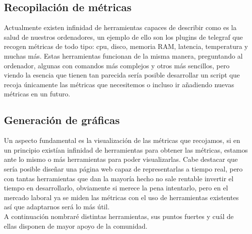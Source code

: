 \documentclass[ spanish, a4paper, 12pt, oneside]{report}
\begin{document}
\subsection{Recopilación de métricas}
Actualmente existen infinidad de herramientas capaces de describir como es la salud de nuestros ordenadores, un ejemplo de ello son los plugins de telegraf que recogen métricas de todo tipo: cpu, disco, 
memoria RAM, latencia, temperatura y muchas más. Estas herramientas funcionan de la misma manera, preguntando al ordenador, algunas con comandos más complejos y otros más sencillos, pero viendo la esencia 
que tienen tan parecida sería posible desarrollar un script que recoja únicamente las métricas que necesitemos o incluso ir añadiendo nuevas métricas en un futuro.\\

\subsection{Generación de gráficas}
Un aspecto fundamental es la visualización de las métricas que recojamos, si en un principio existían infinidad de herramientas para obtener las métricas, estamos ante lo mismo o más herramientas para poder visualizarlas. Cabe destacar que sería posible 
diseñar una página web capaz de representarlas a tiempo real, pero con tantas herramientas que dan la mayoría hecho no sale rentable invertir el tiempo en desarrollarlo, obviamente 
si merece la pena intentarlo, pero en el mercado laboral ya se miden las métricas con el uso de herramientas existentes así que adaptarnos será lo más útil.\\

A continuación nombraré distintas herramientas, sus puntos fuertes y cuál de ellas disponen de mayor apoyo de la comunidad.
\end{document}
